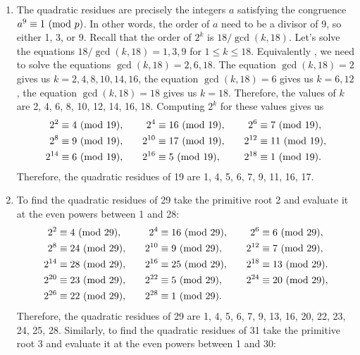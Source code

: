 \begin{solution}
    \begin{enumerate}
        \item The quadratic residues are precisely the integers $a$ satisfying the congruence $a^9 \equiv 1 \ (\mathrm{mod}\ p)$. In other words, the order of $a$ need to be a divisor of 9, so either 1, 3, or 9. Recall that the order of $2^k$ is $18/\gcd(k, 18)$. Let's solve the equations $18/\gcd(k, 18) = 1,3, 9$ for $1 \leq k \leq 18$. Equivalently , we need to solve the equations $\gcd(k, 18) = 2, 6, 18$. The equation $\gcd(k, 18) = 2$ gives us $k = 2, 4, 8, 10, 14, 16$, the equation $\gcd(k, 18) = 6$ gives us $k = 6, 12$, the equation $\gcd(k, 18) = 18$ gives us $k = 18$. Therefore, the values of $k$ are 2, 4, 6, 8, 10, 12, 14, 16, 18. Computing $2^k$ for these values gives us
        \begin{align*}
            2^2 &\equiv 4 \ (\mathrm{mod}\ 19),& \quad 2^4 &\equiv 16 \ (\mathrm{mod}\ 19),& \quad 2^6 &\equiv 7 \ (\mathrm{mod}\ 19), \\
            2^8 &\equiv 9 \ (\mathrm{mod}\ 19),& \quad 2^{10} &\equiv 17 \ (\mathrm{mod}\ 19),& \quad 2^{12} &\equiv 11 \ (\mathrm{mod}\ 19), \\
            2^{14} &\equiv 6 \ (\mathrm{mod}\ 19),& \quad 2^{16} &\equiv 5 \ (\mathrm{mod}\ 19),& \quad 2^{18} &\equiv 1 \ (\mathrm{mod}\ 19).
        \end{align*}
        Therefore, the quadratic residues of 19 are 1, 4, 5, 6, 7, 9, 11, 16, 17.
        \item To find the quadratic residues of 29 take the primitive root 2 and evaluate it at the even powers between 1 and 28:
        \begin{align*}
            2^2 &\equiv 4 \ (\mathrm{mod}\ 29),& \quad 2^4 &\equiv 16 \ (\mathrm{mod}\ 29),& \quad 2^6 &\equiv 6 \ (\mathrm{mod}\ 29), \\
            2^8 &\equiv 24 \ (\mathrm{mod}\ 29),& \quad 2^{10} &\equiv 9 \ (\mathrm{mod}\ 29),& \quad 2^{12} &\equiv 7 \ (\mathrm{mod}\ 29), \\
            2^{14} &\equiv 28 \ (\mathrm{mod}\ 29),& \quad 2^{16} &\equiv 25 \ (\mathrm{mod}\ 29),& \quad 2^{18} &\equiv 13 \ (\mathrm{mod}\ 29). \\
            2^{20} &\equiv 23 \ (\mathrm{mod}\ 29),& \quad 2^{22} &\equiv 5 \ (\mathrm{mod}\ 29),& \quad 2^{24} &\equiv 20 \ (\mathrm{mod}\ 29), \\
            2^{26} &\equiv 22 \ (\mathrm{mod}\ 29),& \quad 2^{28} &\equiv 1 \ (\mathrm{mod}\ 29). &  &
        \end{align*}
        Therefore, the quadratic residues of 29 are 1, 4, 5, 6, 7, 9, 13, 16, 20, 22, 23, 24, 25, 28. Similarly, to find the quadratic residues of 31 take the primitive root 3 and evaluate it at the even powers between 1 and 30:

\end{enumerate}
\end{solution}
